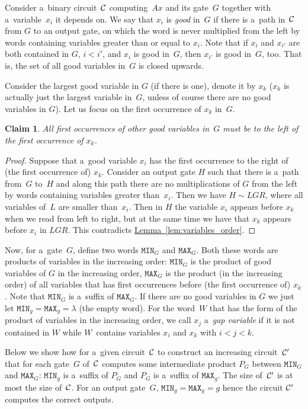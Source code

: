 \documentclass[11pt]{article}
\numberwithin{equation}{section}
\newtheorem{claim}[theorem]{Claim}
\theoremstyle{definition}
\theoremstyle{plain}
\newcommand{\expref}[2]{\hyperref[#2]{#1~\ref{#2}}}
\theoremstyle{plain}\newtheorem{observation}[theorem]{Observation}
\newcommand{\mmin}{\texttt{MIN}}
\newcommand{\mmax}{\texttt{MAX}}
\begin{document}
Consider a~binary circuit~${\cal C}$ computing~$Ax$ and its gate~$G$ together with a~variable~$x_i$ it depends on.
We say that $x_i$ is \emph{good} in~$G$ if there is
a~path in~${\cal C}$ from $G$ to an output gate, on which the word is never multiplied from the left by words containing variables greater than or equal to $x_i$.
Note that if $x_i$ and $x_{i'}$ are both contained in $G$, $i<i'$, and $x_i$ is good in~$G$, then $x_{i'}$ is good in~$G$, too. That is, the set of all good variables in~$G$ is closed upwards.

Consider the largest good variable in $G$ (if there is one), denote it by $x_k$ ($x_k$ is actually just the largest variable in~$G$, unless of course there are no good variables in $G$). Let us focus on the first occurrence of $x_k$ in~$G$.

\begin{claim}
    All first occurrences of other good variables in~$G$ must be to the left of the first occurrence of $x_k$.
\end{claim}

\begin{proof}
    Suppose that a~good variable $x_i$ has the first occurrence to the right of (the first occurrence of) $x_k$. Consider an output gate $H$ such that there is a~path from~$G$ to~$H$ and along this path there are no multiplications of $G$ from the left by words containing variables greater than~$x_i$. Then we have $H \sim LGR$, where all variables of~$L$ are smaller than~$x_i$. Then in $H$ the variable $x_i$ appears before $x_k$ when we read from left to right, but at the same time we have that $x_k$ appears before $x_i$ in $LGR$. This contradicts \expref{Lemma}{lem:variables_order}.
\end{proof}

Now, for a~gate~$G$, define two words $\mmin_G$ and $\mmax_G$. Both these words are products of variables in the increasing order: $\mmin_G$ is the product of good variables of $G$ in the increasing order, $\mmax_G$ is the product (in the increasing order) of all variables that has first occurrences before (the first occurrence of) $x_k$. Note that $\mmin_G$ is
a~suffix of $\mmax_G$. If there are no good variables in $G$ we just let $\mmin_g=\mmax_g=\lambda$ (the empty word).
%
For the word~$W$ that has the form of the product of variables in the increasing order, we call $x_j$ a~\emph{gap variable} if it is not contained in $W$
while $W$~contains variables $x_i$ and $x_k$ with $i < j < k$.

Below we show how for a~given circuit~${\cal C}$ to construct an increasing circuit~${\cal C}'$ that for each gate~$G$ of~${\cal C}$ computes some intermediate product $P_G$ between $\mmin_G$ and $\mmax_G$: $\mmin_g$ is a~suffix of $P_G$ and $P_G$ is a~suffix of $\mmax_g$. The size of~${\cal C}'$ is at most the size of~${\cal C}$. For an output gate~$G$, $\mmin_g=\mmax_g=g$ hence the circuit ${\cal C}'$ computes the correct outputs.
\end{document}
